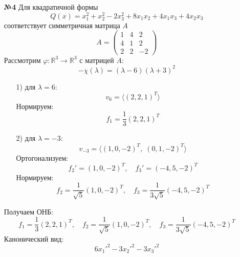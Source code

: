 \documentclass[a4paper]{article}
\renewcommand{\f}[2]{\frac{#1}{#2}}
\renewcommand{\phi}{\varphi}
\newcommand{\RR}{\mathbb{R}}
\begin{document}
\begin{enumerate}
  \item[\textbf{№4}]Для квадратичной формы
  $$
  Q(x)=x_1^2+x_2^2-2x_3^2+8x_1x_2+4x_1x_3+4x_2x_3
  $$
  соответствует симметричная матрица $A$
  $$
  A=\begin{pmatrix}
  1 & 4 & 2\\
  4 & 1 & 2\\
  2 & 2 & -2
  \end{pmatrix}
  $$
  Рассмотрим $\phi: \RR^3 \to \RR^3$ с матрицей $A$:
  $$-\chi(\lambda) = (\lambda-6)(\lambda+3)^2$$
  \begin{enumerate}
    \item[1)] для $\lambda = 6$:
    $$v_6 = \langle (2,2,1)^T \rangle$$
    Нормируем:
    $$f_1 = \f{1}{3}(2,2,1)^T$$
    \item[2)] для $\lambda = -3$:
    $$v_{-3} = \langle (1,0,-2)^T,\;(0,1,-2)^T\rangle$$
    Ортогонализуем:
    $$f_2' = (1,0,-2)^T, \quad f_3' = (-4,5,-2)^T$$
    Нормируем:
    $$f_2 = \f{1}{\sqrt{5}}(1,0,-2)^T, \quad f_3 = \f{1}{3\sqrt{5}}(-4,5,-2)^T$$
  \end{enumerate}
  Получаем ОНБ:
  $$f_1 = \f{1}{3}(2,2,1)^T, \quad f_2 = \f{1}{\sqrt{5}}(1,0,-2)^T, \quad f_3 = \f{1}{3\sqrt{5}}(-4,5,-2)^T$$
  Канонический вид:
  $$6x_1'^2 -3x_2'^2 - 3x_3'^2$$\\


\end{enumerate}
\end{document}
